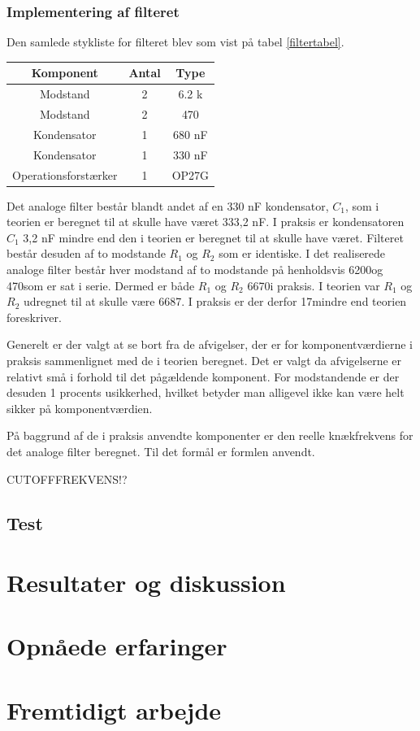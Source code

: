 \subsubsection{Implementering af filteret}
Den samlede stykliste for filteret blev som vist på tabel \ref{filtertabel}.

\begin{center}
\begin{tabular}{|c|c|c|}
\hline 
Komponent & Antal & Type \\ 
\hline 
Modstand & 2 & 6.2 k \\ 
\hline 
Modstand & 2 & 470\\
\hline
Kondensator & 1 & 680 nF\\
\hline
Kondensator & 1 & 330 nF\\
\hline
Operationsforstærker & 1 & OP27G \\ 
\hline
\end{tabular} 
\label{filtertabel}
\end{center}

Det analoge filter består blandt andet af en 330 nF kondensator, $C_{1}$, som i teorien er beregnet til at skulle have været 333,2 nF. I praksis er kondensatoren $C_{1}$ 3,2 nF mindre end den i teorien er beregnet til at skulle have været. Filteret består desuden af to modstande $R_{1}$ og $R_{2}$ som er identiske. I det realiserede analoge filter består hver modstand af to modstande på henholdsvis 6200\Ohm og 470\Ohm som er sat i serie. Dermed er både $R_{1}$ og $R_{2}$ 6670\Ohm i praksis. I teorien var $R_{1}$ og $R_{2}$ udregnet til at skulle være 6687\Ohm. I praksis er der derfor 17\Ohm mindre end teorien foreskriver.\

Generelt er der valgt at se bort fra de afvigelser, der er for komponentværdierne i praksis sammenlignet med de i teorien beregnet. Det er valgt da afvigelserne er relativt små i forhold til det pågældende komponent. For modstandende er der desuden 1 procents usikkerhed, hvilket betyder man alligevel ikke kan være helt sikker på komponentværdien.\

På baggrund af de i praksis anvendte komponenter er den reelle knækfrekvens for det analoge filter beregnet. Til det formål er formlen anvendt.\

CUTOFFFREKVENS!?

\subsection{Test}


\section{Resultater og diskussion}


\section{Opnåede erfaringer}


\section{Fremtidigt arbejde}
